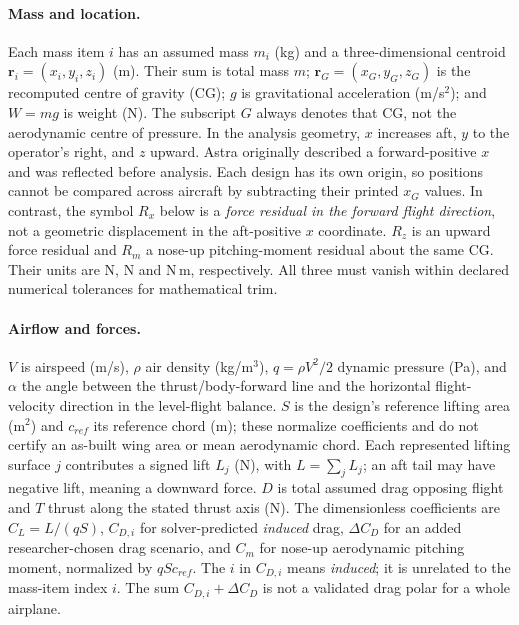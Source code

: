 \documentclass[10pt,letterpaper]{article}
\begin{document}
\paragraph{Mass and location.} Each mass item $i$ has an assumed mass $m_i$ (kg) and a three-dimensional centroid $\boldsymbol r_i=(x_i,y_i,z_i)$ (m). Their sum is total mass $m$; $\boldsymbol r_G=(x_G,y_G,z_G)$ is the recomputed centre of gravity (CG); $g$ is gravitational acceleration (m/s$^2$); and $W=mg$ is weight (N). The subscript $G$ always denotes that CG, not the aerodynamic centre of pressure. In the analysis geometry, $x$ increases aft, $y$ to the operator's right, and $z$ upward. Astra originally described a forward-positive $x$ and was reflected before analysis. Each design has its own origin, so positions cannot be compared across aircraft by subtracting their printed $x_G$ values. In contrast, the symbol $R_x$ below is a \emph{force residual in the forward flight direction}, not a geometric displacement in the aft-positive $x$ coordinate. $R_z$ is an upward force residual and $R_m$ a nose-up pitching-moment residual about the same CG. Their units are N, N and N\,m, respectively. All three must vanish within declared numerical tolerances for mathematical trim.

\paragraph{Airflow and forces.} $V$ is airspeed (m/s), $\rho$ air density (kg/m$^3$), $q=\rho V^2/2$ dynamic pressure (Pa), and $\alpha$ the angle between the thrust/body-forward line and the horizontal flight-velocity direction in the level-flight balance. $S$ is the design's reference lifting area (m$^2$) and $c_{ref}$ its reference chord (m); these normalize coefficients and do not certify an as-built wing area or mean aerodynamic chord. Each represented lifting surface $j$ contributes a signed lift $L_j$ (N), with $L=\sum_j L_j$; an aft tail may have negative lift, meaning a downward force. $D$ is total assumed drag opposing flight and $T$ thrust along the stated thrust axis (N). The dimensionless coefficients are $C_L=L/(qS)$, $C_{D,i}$ for solver-predicted \emph{induced} drag, $\Delta C_D$ for an added researcher-chosen drag scenario, and $C_m$ for nose-up aerodynamic pitching moment, normalized by $qSc_{ref}$. The $i$ in $C_{D,i}$ means \emph{induced}; it is unrelated to the mass-item index $i$. The sum $C_{D,i}+\Delta C_D$ is not a validated drag polar for a whole airplane.
\end{document}
